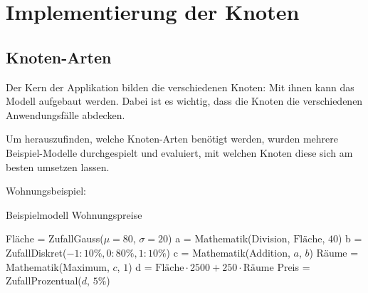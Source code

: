 
\chapter{Implementierung der Knoten}

\section{Knoten-Arten}
Der Kern der Applikation bilden die verschiedenen Knoten: Mit ihnen kann das Modell aufgebaut werden. Dabei ist es wichtig, dass die Knoten die verschiedenen Anwendungsfälle abdecken.

Um herauszufinden, welche Knoten-Arten benötigt werden, wurden mehrere Beispiel-Modelle durchgespielt und evaluiert, mit welchen Knoten diese sich am besten umsetzen lassen.

Wohnungsbeispiel:
\begin{algorithm}[H]
    \caption{Beispielmodell Wohnungspreise}
    \begin{algorithmic}[1]
        \State Fläche = ZufallGauss($\mu = 80$, $\sigma = 20$)
        \State a = Mathematik(Division, $\textrm{Fläche}$, $40$)
        \State b = ZufallDiskret($-1: 10\%, 0: 80\%, 1: 10\%$)
        \State c = Mathematik(Addition, $a$, $b$)
        \State Räume = Mathematik(Maximum, $c$, $1$)
        \State d = $\textrm{Fläche} \cdot 2500 + 250 \cdot \textrm{Räume}$
        \State Preis = ZufallProzentual($d$, $5\%$)
    \end{algorithmic}
\end{algorithm}

